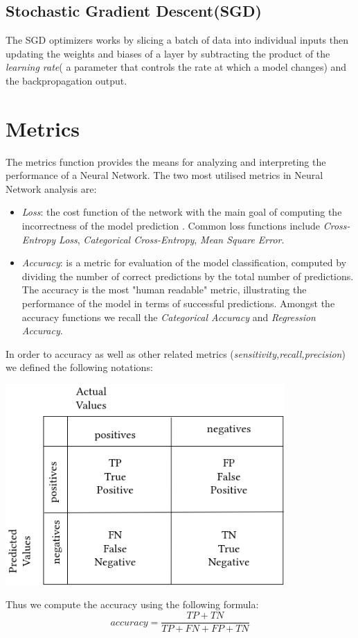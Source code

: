 \subsection*{Stochastic Gradient Descent(SGD)}
The SGD optimizers works by slicing a batch of data into individual inputs then updating the
weights and biases of a layer by subtracting the product of the \textit{learning rate}( a parameter that controls the rate
at which a model changes) and the backpropagation output.

\section{Metrics}
The metrics function provides the means for analyzing and interpreting the performance of a Neural Network.
The two most utilised metrics in Neural Network analysis are:
\begin{itemize}
	\item \textit{Loss}:
		the cost function of the network with the main goal of computing
		the incorrectness of the model prediction . Common loss functions include \textit{Cross-Entropy Loss},
		\textit{Categorical Cross-Entropy}, \textit{Mean Square Error}.
	\item \textit{Accuracy}: is a metric for evaluation of the model classification,
		computed by dividing the number of correct predictions by the total
		number of predictions.
		The accuracy is the most "human readable" metric, illustrating the
		performance of the model in terms of successful predictions. Amongst the accuracy
		functions we recall the \textit{Categorical Accuracy} and \textit{Regression Accuracy}.
\end{itemize}

In order to accuracy as well as other related metrics (\textit{sensitivity,recall,precision}) we defined the following
notations:
\begin{center}
	\includegraphics[width = 4.2in]{images/cm.png}
	\centerline{}
\label{cm}
\end{center}
Thus we compute the accuracy using the following formula:
\[accuracy = \frac{TP+TN}{TP+FN+FP+TN} \]
